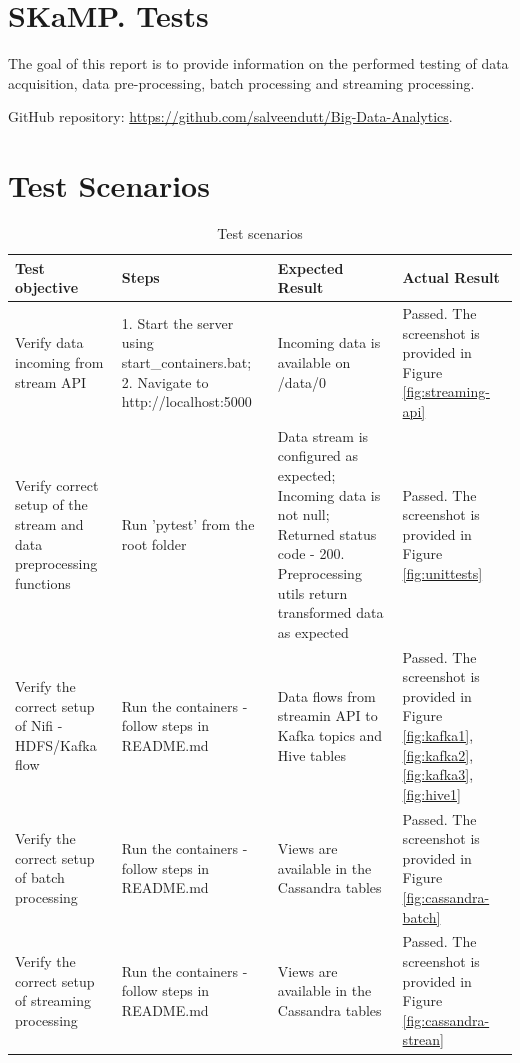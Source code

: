 \documentclass[12pt,a4paper, hidelinks]{article}
\begin{document}
\section*{SKaMP. Tests}
\vspace{\baselineskip} %

The goal of this report is to provide information on the performed testing of data acquisition, data pre-processing, batch processing and streaming processing.

GitHub repository: \href{https://github.com/salveendutt/Big-Data-Analytics}{https://github.com/salveendutt/Big-Data-Analytics}.

\section{Test Scenarios}

\begin{table}[h!]
\centering
\begin{tabular}{|p{3cm}|p{4cm}|p{3cm}|p{5cm}|}
\hline
\textbf{Test objective} & \textbf{Steps} & \textbf{Expected Result} & \textbf{Actual Result} \\
\hline
Verify data incoming from stream API & 1. Start the server using start\_containers.bat; 2. Navigate to http://localhost:5000 & Incoming data is available on /data/0 & Passed. The screenshot is provided in Figure \ref{fig:streaming-api} \\
\hline
Verify correct setup of the stream and data preprocessing functions & Run 'pytest' from the root folder & Data stream is configured as expected; Incoming data is not null; Returned status code - 200. Preprocessing utils return transformed data as expected & Passed. The screenshot is provided in Figure \ref{fig:unittests} \\
\hline
Verify the correct setup of Nifi - HDFS/Kafka flow & Run the containers - follow steps in README.md & Data flows from streamin API to Kafka topics and Hive tables & Passed. The screenshot is provided in Figure \ref{fig:kafka1}, \ref{fig:kafka2}, \ref{fig:kafka3}, \ref{fig:hive1} \\
\hline
Verify the correct setup of batch processing & Run the containers - follow steps in README.md & Views are available in the Cassandra tables & Passed. The screenshot is provided in Figure \ref{fig:cassandra-batch} \\
\hline
Verify the correct setup of streaming processing & Run the containers - follow steps in README.md & Views are available in the Cassandra tables & Passed. The screenshot is provided in Figure \ref{fig:cassandra-strean} \\
\hline

\end{tabular}
\caption{Test scenarios}
\end{table}
\end{document}

